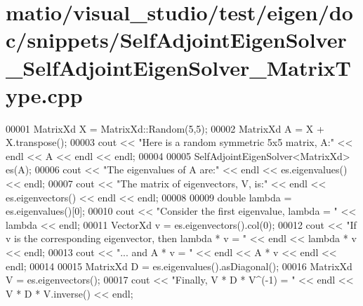 \hypertarget{matio_2visual__studio_2test_2eigen_2doc_2snippets_2_self_adjoint_eigen_solver___self_adjoint_eigen_solver___matrix_type_8cpp_source}{}\section{matio/visual\+\_\+studio/test/eigen/doc/snippets/\+Self\+Adjoint\+Eigen\+Solver\+\_\+\+Self\+Adjoint\+Eigen\+Solver\+\_\+\+Matrix\+Type.cpp}
\label{matio_2visual__studio_2test_2eigen_2doc_2snippets_2_self_adjoint_eigen_solver___self_adjoint_eigen_solver___matrix_type_8cpp_source}

\begin{DoxyCode}
00001 MatrixXd X = MatrixXd::Random(5,5);
00002 MatrixXd A = X + X.transpose();
00003 cout << \textcolor{stringliteral}{"Here is a random symmetric 5x5 matrix, A:"} << endl << A << endl << endl;
00004 
00005 SelfAdjointEigenSolver<MatrixXd> es(A);
00006 cout << \textcolor{stringliteral}{"The eigenvalues of A are:"} << endl << es.eigenvalues() << endl;
00007 cout << \textcolor{stringliteral}{"The matrix of eigenvectors, V, is:"} << endl << es.eigenvectors() << endl << endl;
00008 
00009 \textcolor{keywordtype}{double} lambda = es.eigenvalues()[0];
00010 cout << \textcolor{stringliteral}{"Consider the first eigenvalue, lambda = "} << lambda << endl;
00011 VectorXd v = es.eigenvectors().col(0);
00012 cout << \textcolor{stringliteral}{"If v is the corresponding eigenvector, then lambda * v = "} << endl << lambda * v << endl;
00013 cout << \textcolor{stringliteral}{"... and A * v = "} << endl << A * v << endl << endl;
00014 
00015 MatrixXd D = es.eigenvalues().asDiagonal();
00016 MatrixXd V = es.eigenvectors();
00017 cout << \textcolor{stringliteral}{"Finally, V * D * V^(-1) = "} << endl << V * D * V.inverse() << endl;
\end{DoxyCode}

